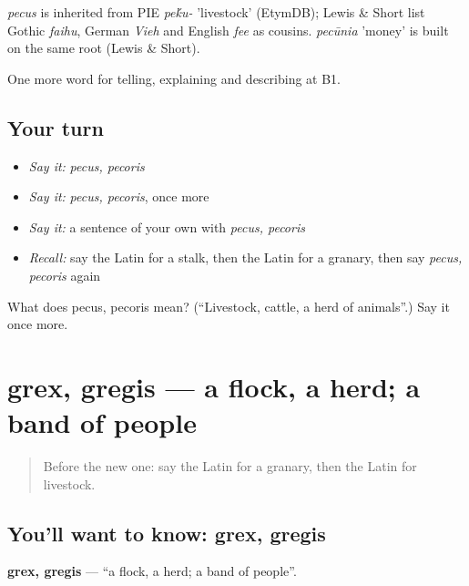 \begin{cousinweb}
\emph{pecus} is inherited from PIE \emph{pe\'{k}u-} 'livestock' (EtymDB); Lewis \& Short list Gothic \emph{faihu}, German \emph{Vieh} and English \emph{fee} as cousins. \emph{pecūnia} 'money' is built on the same root (Lewis \& Short).
\end{cousinweb}

\begin{grammarlens}[title={What you've built}]
One more word for telling, explaining and describing at B1.
\end{grammarlens}

\subsection*{Your turn}
\begin{itemize}
\raggedright
  \item \emph{Say it:} \emph{pecus, pecoris}
  \item \emph{Say it:} \emph{pecus, pecoris}, once more
  \item \emph{Say it:} a sentence of your own with \emph{pecus, pecoris}
  \item \emph{Recall:} say the Latin for a stalk, then the Latin for a granary, then say \emph{pecus, pecoris} again
\end{itemize}

\begin{tcolorbox}[breakable,colback=teal!4,colframe=teal!35!black,title={Before you move on}]
What does pecus, pecoris mean? (\textquotedblleft{}Livestock, cattle, a herd of animals\textquotedblright{}.) Say it once more.
\end{tcolorbox}
\section[grex, gregis]{grex, gregis — a flock, a herd; a band of people}

\label{lesson:LA-C477-grex}



\begin{quote}
Before the new one: say the Latin for a granary, then the Latin for livestock.
\end{quote}

\subsection*{You'll want to know: grex, gregis}
\textbf{grex, gregis} — \textquotedblleft{}a flock, a herd; a band of people\textquotedblright{}.

